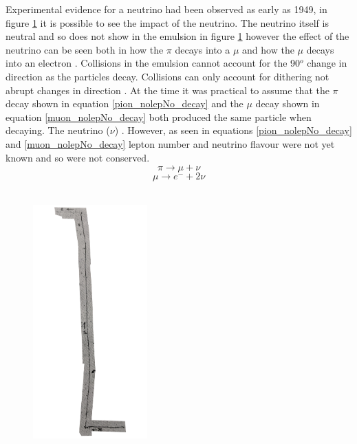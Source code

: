 Experimental evidence for a neutrino had been observed as early as 1949, in figure \ref{pion_path} it is possible to see the impact of the neutrino. The neutrino itself is neutral and so does not show in the emulsion in figure \ref{pion_path} however the effect of the neutrino can be seen both in how the $\pi$ decays into a $\mu$ and how the $\mu$ decays into an electron \cite{griffiths2008book} \cite{griffiths2008neutrino1.5}. Collisions in the emulsion cannot account for the 90$^o$ change in direction as the particles decay. Collisions can only account for dithering not abrupt changes in direction \cite{griffiths2008book} \cite{griffiths2008neutrino1.5}. At the time it was practical to assume that the $\pi$ decay shown in equation \ref{pion_nolepNo_decay} and the $\mu$ decay shown in equation \ref{muon_nolepNo_decay} both produced the same particle when decaying. The neutrino ($\nu$) \cite{griffiths2008book} \cite{griffiths2008neutrino1.5}. However, as seen in equations \ref{pion_nolepNo_decay} and \ref{muon_nolepNo_decay} lepton number and neutrino flavour were not yet known and so were not conserved.
\begin{equation}
    \pi \rightarrow \mu + \nu
    \label{pion_nolepNo_decay}
\end{equation}
\begin{equation}
    \mu \rightarrow e^- + 2\nu
    \label{muon_nolepNo_decay}
\end{equation}
\\
\begin{figure}[htbp]
 \centering
 \includegraphics[height=90mm]{Chapter1/Figs/Raster/less_detailed_proper_path.png}
 \label{pion_path}
\end{figure}
